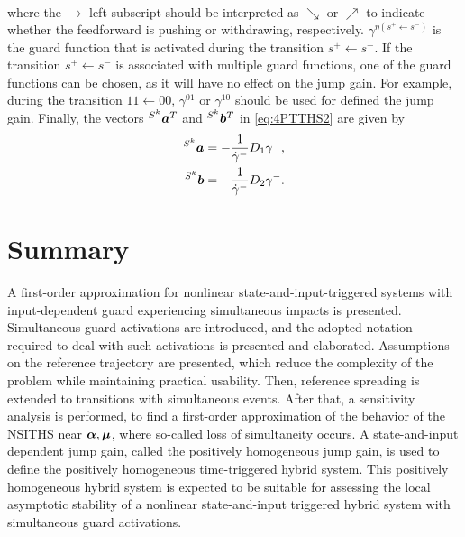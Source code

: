\documentclass[../DC2017114Bouma.tex]{subfiles}
\begin{document}
\begin{mydef}[PTTHS]
\begin{align*}
\end{align*}
where the $\rightarrow$ left subscript should be interpreted as $\searrow$ or $\nearrow$ to indicate whether the feedforward is pushing or withdrawing, respectively. $\gamma^{\eta(s^+\leftarrow s^-)}$ is the guard function that is activated during the transition $s^+\leftarrow s^-$. If the transition $s^+\leftarrow s^-$ is associated with multiple guard functions, one of the guard functions can be chosen, as it will have no effect on the jump gain. For example, during the transition $11\leftarrow 00$, $\gamma^{01}$ or $\gamma^{10}$ should be used for defined the jump gain. Finally, the vectors $\hspace{0cm}^{S^k}{\boldsymbol{a}}^T$ and $\hspace{0cm}^{S^k}{\boldsymbol{b}}^T$ in \eqref{eq:4PTTHS2} are given by
\begin{align*}
\hspace{0cm}^{S^k}{\boldsymbol{a}} &= -\frac{1}{\dot{\gamma}^{-}}D_1\gamma^{-},\\
\hspace{0cm}^{S^k}{\boldsymbol{b}} &= -\frac{1}{\dot{\gamma}^{-}}D_2\gamma^{-}.
\end{align*}
\end{mydef}

%
%
%
%
%
%

\section{Summary}
A first-order approximation for nonlinear state-and-input-triggered systems with input-dependent guard experiencing simultaneous impacts is presented. Simultaneous guard activations are introduced, and the adopted notation required to deal with such activations is presented and elaborated. Assumptions on the reference trajectory are presented, which reduce the complexity of the problem while maintaining practical usability. Then, reference spreading is extended to transitions with simultaneous events. After that, a sensitivity analysis is performed, to find a first-order approximation of the behavior of the NSITHS near $\boldsymbol{\alpha},\boldsymbol{\mu}$, where so-called loss of simultaneity occurs. A state-and-input dependent jump gain, called the positively homogeneous jump gain, is used to define the positively homogeneous time-triggered hybrid system. This positively homogeneous hybrid system is expected to be suitable for assessing the local asymptotic stability of a nonlinear state-and-input triggered hybrid system with simultaneous guard activations.
\end{document}
